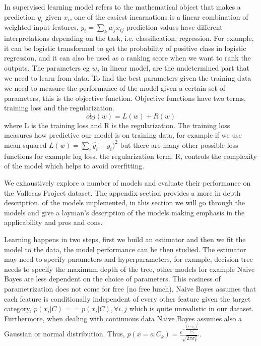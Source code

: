 \documentclass[11pt]{article}
\begin{document}
\cite{patania2017topological}
In supervised learning model refers to the mathematical object that makes a prediction $y_i$ given $x_i$, one of the easiest incarnations is a linear combination of weighted input features, $y_i = \sum_k w_j x_{ij}$ prediction values have different interpretations depending on the task, i.e. classification, regression. For example, it can be logistic transformed to get the probability of positive class in logistic regression, and it can also be used as a ranking score when we want to rank the outputs.
The parameters eg $w_j$ in linear model, are the undetermined part that we need to learn from data. To find the best parameters given the training data we need to measure the performance of the model given a certain set of parameters, this is the objective function. Objective functions have two terms, training loss and the regularization.
\begin{equation}
obj(w) = L(w) + R(w)
\end{equation}
where L is the training loss and R is the regularization. The training loss measures how predictive our model is on training data, for example if we use mean squared $L(w) = \sum_i \hat{y_i} - y_i)^2$ but there are many other possible loss functions for example log loss.
the regularization term, R, controls the complexity of the model which helps to avoid overfitting.


We exhaustively explore a number of models and evaluate their performance on the Vallecas Project dataset.
The appendix section provides a more in depth description.  of the models implemented, in this section we will
go through the models and give a layman's description of the models making emphasis in the applicability and pros and cons.

Learning happens in two steps, first we build an estimator and then we fit the model to the data, the model performance can be then studied. The estimator may need to specify parameters and hyperparameters, for example, decision tree needs to specify the maximum depth of the tree, other models for example Naive Bayes are less dependent on the choice of parameters. 
This easiness of parametrization does not come for free (no free lunch), Naive Bayes assumes that each feature is conditionally independent of every other feature given the target category, $p(x_i|C) == p(x_i|C), \forall i,j$ which is quite unrealistic in our dataset. Furthermore, when dealing with continuous data Naive Bayes assumes also a Gaussian or normal distribution. Thus, 
$p(x = a|C_k) = \frac{e^{-\frac{(a-\mu_k)^2}{2\sigma_k^{2}}}} {\sqrt{2\pi\sigma_k^{2}}}$. 
\end{document}
